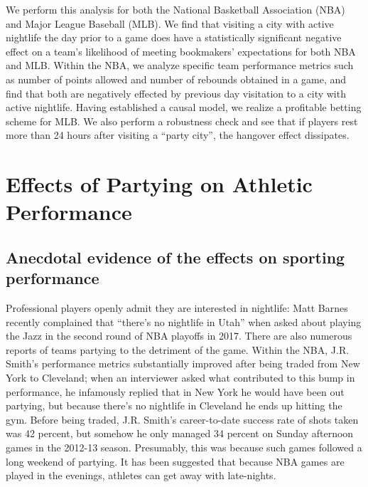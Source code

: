\documentclass[letterpaper,12pt]{article}
\begin{document}
We perform this analysis for both the National Basketball Association
(NBA) and Major League Baseball (MLB). 
We find that visiting a city with active nightlife the day prior to a game does have a 
statistically significant negative effect on a team's likelihood of meeting bookmakers' expectations
for both NBA and MLB. Within the NBA, we analyze specific team performance metrics such as number of points allowed and number of rebounds obtained in a game, and find that both are negatively effected by previous day visitation to a city with active nightlife. Having established a causal model, we realize a profitable betting scheme for MLB. We also perform a robustness check and see that if players rest more than
 24 hours after visiting a ``party city'', the hangover effect dissipates.

\section{Effects of Partying on Athletic Performance}

\subsection{Anecdotal evidence of the effects on sporting performance}
Professional players openly admit they are interested in nightlife: Matt Barnes recently complained that 
``there's no nightlife in Utah'' when asked about playing the Jazz in the second round of NBA playoffs 
in 2017.\citep{cestone}
There are also numerous reports of teams partying to the detriment of the game.
Within the NBA, J.R. Smith's performance metrics substantially improved 
 after being traded from New York to Cleveland; when an interviewer
asked what contributed to this bump in performance, he infamously replied
that in New York he would have been out partying, but because there's no nightlife in Cleveland he ends up hitting the gym.\citep{price,ley} Before being traded, J.R. Smith's career-to-date success rate of shots taken was 42 percent, but somehow he only managed 
34 percent on Sunday afternoon games in the 2012-13 season.
Presumably, this was because such games followed a long weekend of partying.\citep{princeofthecity} It has been suggested that because
NBA games are played in the evenings, athletes can get away with late-nights.\citep{drodmanbleacherreport}
\end{document}
